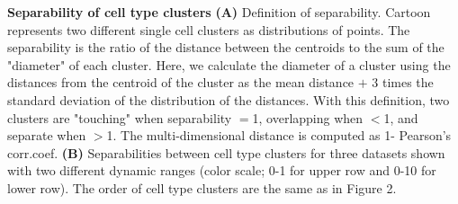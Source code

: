 \textbf{Separability of cell type clusters}
\textbf{(A)} Definition of separability. Cartoon represents two different single cell clusters as distributions of points. The separability is the ratio of the distance between the centroids to the sum of the "diameter" of each cluster. Here, we calculate the diameter of a cluster using the distances from the centroid of the cluster as the mean distance $+$ 3 times the standard deviation of the distribution of the distances. With this definition, two clusters are "touching" when separability $=$1, overlapping when $<$1, and separate when $>$1. The multi-dimensional distance is computed as 1- Pearson's corr.coef.
\textbf{(B)} Separabilities between cell type clusters for three datasets shown with two different dynamic ranges (color scale; 0-1 for upper row and 0-10 for lower row).  The order of cell type clusters are the same as in Figure 2.